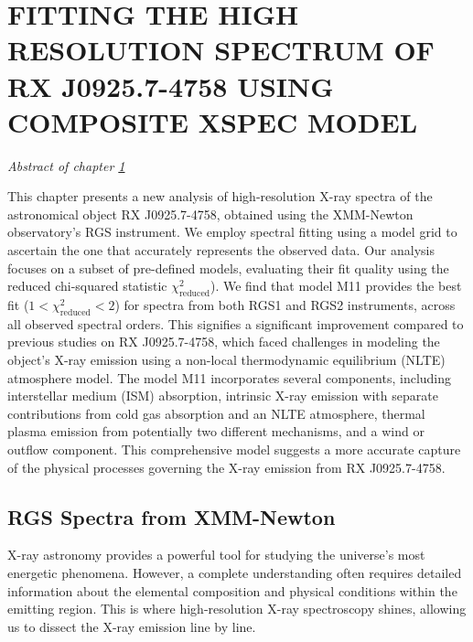 \chapter{FITTING THE HIGH RESOLUTION SPECTRUM OF RX J0925.7-4758 USING COMPOSITE XSPEC MODEL} \label{chap:hi-resolution}
    \minitoc
    \begin{center}
    	\emph{Abstract of chapter \ref{chap:hi-resolution}}
    \end{center}
    This chapter presents a new analysis of high-resolution X-ray spectra of the astronomical object RX J0925.7-4758, obtained using the XMM-Newton observatory's RGS instrument. We employ spectral fitting using a model grid to ascertain the one that accurately represents the observed data. Our analysis focuses on a subset of pre-defined models, evaluating their fit quality using the reduced chi-squared statistic $\chi^2_\text{reduced}$). We find that model M11 provides the best fit ($1<\chi^2_\text{reduced}<2$) for spectra from both RGS1 and RGS2 instruments, across all observed spectral orders. This signifies a significant improvement compared to previous studies on RX J0925.7-4758, which faced challenges in modeling the object's X-ray emission using a non-local thermodynamic equilibrium (NLTE) atmosphere model. The model M11 incorporates several components, including interstellar medium (ISM) absorption, intrinsic X-ray emission with separate contributions from cold gas absorption and an NLTE atmosphere, thermal plasma emission from potentially two different mechanisms, and a wind or outflow component. This comprehensive model suggests a more accurate capture of the physical processes governing the X-ray emission from RX J0925.7-4758.

	\section{RGS Spectra from XMM-Newton} \label{hi-resolution:rgs-spec}
		X-ray astronomy provides a powerful tool for studying the universe's most energetic phenomena. However, a complete understanding often requires detailed information about the elemental composition and physical conditions within the emitting region. This is where high-resolution X-ray spectroscopy shines, allowing us to dissect the X-ray emission line by line.
		
